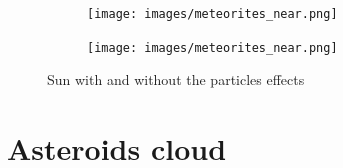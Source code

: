 \documentclass[paper=a4, fontsize=11pt]{scrartcl} %
\numberwithin{equation}{section} %
\numberwithin{figure}{section} %
\numberwithin{table}{section} %
\theoremstyle{definition}
\begin{document}
\begin{figure}
	\centering
	\begin{subfigure}{.4\textwidth}
		\centering
		\texttt{[image: images/meteorites\_near.png]}
	\end{subfigure}
	\begin{subfigure}{.4\textwidth}
		\centering
		\texttt{[image: images/meteorites\_near.png]}
	\end{subfigure}
	\caption{Sun with and without the particles effects}
	\label{fig:meteorites}
\end{figure}


\section{Asteroids cloud}
\end{document}
